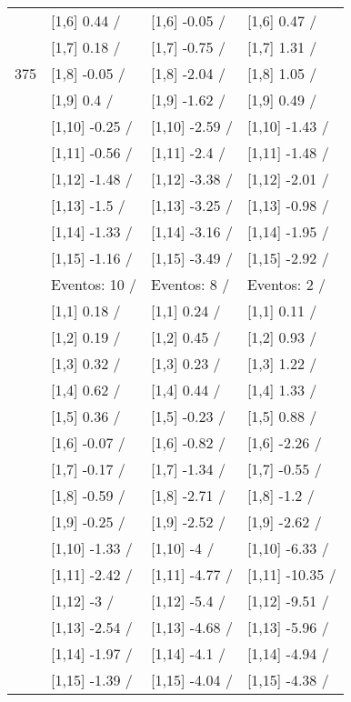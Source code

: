 \begin{table}
\begin{tabular}[t]{llll}
 & {}[1,6] 0.44  / & {}[1,6] -0.05  / & {}[1,6] 0.47  /\\
 & {}[1,7] 0.18  / & {}[1,7] -0.75  / & {}[1,7] 1.31  /\\
375 & {}[1,8] -0.05  / & {}[1,8] -2.04  / & {}[1,8] 1.05  /\\
\addlinespace
 & {}[1,9] 0.4  / & {}[1,9] -1.62  / & {}[1,9] 0.49  /\\
 & {}[1,10] -0.25  / & {}[1,10] -2.59  / & {}[1,10] -1.43  /\\
 & {}[1,11] -0.56  / & {}[1,11] -2.4  / & {}[1,11] -1.48  /\\
 & {}[1,12] -1.48  / & {}[1,12] -3.38  / & {}[1,12] -2.01  /\\
 & {}[1,13] -1.5  / & {}[1,13] -3.25  / & {}[1,13] -0.98  /\\
\addlinespace
 & {}[1,14] -1.33  / & {}[1,14] -3.16  / & {}[1,14] -1.95  /\\
 & {}[1,15] -1.16  / & {}[1,15] -3.49  / & {}[1,15] -2.92  /\\
 & Eventos:  10 / & Eventos:  8 / & Eventos:  2 /\\
 & {}[1,1] 0.18  / & {}[1,1] 0.24  / & {}[1,1] 0.11  /\\
 & {}[1,2] 0.19  / & {}[1,2] 0.45  / & {}[1,2] 0.93  /\\
\addlinespace
 & {}[1,3] 0.32  / & {}[1,3] 0.23  / & {}[1,3] 1.22  /\\
 & {}[1,4] 0.62  / & {}[1,4] 0.44  / & {}[1,4] 1.33  /\\
 & {}[1,5] 0.36  / & {}[1,5] -0.23  / & {}[1,5] 0.88  /\\
 & {}[1,6] -0.07  / & {}[1,6] -0.82  / & {}[1,6] -2.26  /\\
 & {}[1,7] -0.17  / & {}[1,7] -1.34  / & {}[1,7] -0.55  /\\
\addlinespace
500 & {}[1,8] -0.59  / & {}[1,8] -2.71  / & {}[1,8] -1.2  /\\
 & {}[1,9] -0.25  / & {}[1,9] -2.52  / & {}[1,9] -2.62  /\\
 & {}[1,10] -1.33  / & {}[1,10] -4  / & {}[1,10] -6.33  /\\
 & {}[1,11] -2.42  / & {}[1,11] -4.77  / & {}[1,11] -10.35  /\\
 & {}[1,12] -3  / & {}[1,12] -5.4  / & {}[1,12] -9.51  /\\
\addlinespace
 & {}[1,13] -2.54  / & {}[1,13] -4.68  / & {}[1,13] -5.96  /\\
 & {}[1,14] -1.97  / & {}[1,14] -4.1  / & {}[1,14] -4.94  /\\
 & {}[1,15] -1.39  / & {}[1,15] -4.04  / & {}[1,15] -4.38  /\\
\bottomrule
\end{tabular}
\end{table}

